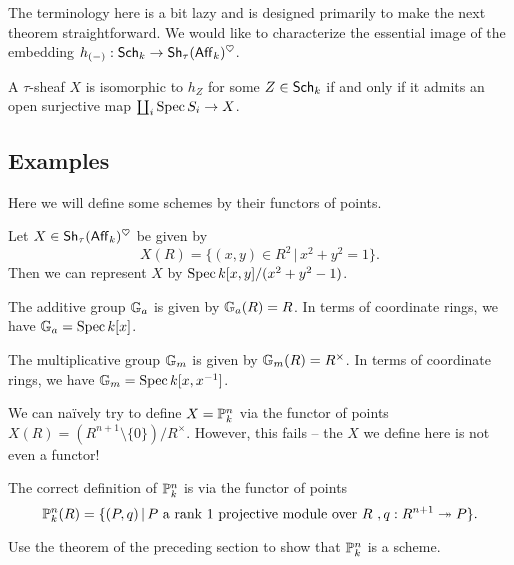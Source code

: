 \documentclass{amsart}
\begin{document}
The terminology here is a bit lazy and is designed primarily to make the next theorem straightforward.
We would like to characterize the essential image of the embedding $h_{(-)}: \mathsf{Sch}_k \to \mathsf{Sh}_\tau(\mathsf{Aff}_k)^\heartsuit$.

\begin{thm}
A $\tau$-sheaf $X$ is isomorphic to $h_Z$ for some $Z \in \mathsf{Sch}_k$ if and only if it admits an open surjective map $\coprod_i \operatorname{Spec} S_i \to X$.
\end{thm}

\subsection{Examples}

Here we will define some schemes by their functors of points.

\begin{ex}
	Let $X \in \mathsf{Sh}_\tau(\mathsf{Aff}_k)^\heartsuit$ be given by
	\[
		X(R) = \{ (x, y) \in R^2 \, | \, x^2 + y^2 = 1 \}.
	\]
	Then we can represent $X$ by $\operatorname{Spec} k[x, y] / (x^2 + y^2 - 1)$.
\end{ex}

\begin{ex}
	The additive group $\mathbb{G}_a$ is given by $\mathbb{G}_a(R) = R$.
	In terms of coordinate rings, we have $\mathbb{G}_a = \operatorname{Spec} k[x]$.
\end{ex}

\begin{ex}
	The multiplicative group $\mathbb{G}_m$ is given by $\mathbb{G}_m(R) = R^\times$.
	In terms of coordinate rings, we have $\mathbb{G}_m = \operatorname{Spec} k[x, x^{-1}]$.
\end{ex}

\begin{ex}
	We can na\"ively try to define $X = \mathbb{P}^n_k$ via the functor of points $X(R) = (R^{n+1} \setminus \{ 0 \}) / R^\times$.
	However, this fails -- the $X$ we define here is not even a functor!
\end{ex}

\begin{ex}
	The correct definition of $\mathbb{P}^n_k$ is via the functor of points
	\[
		\mathbb{P}^n_k(R) = \{ (P, q) \, | \, P \textrm{ a rank $1$ projective module over $R$ }, q: R^{n+1} \twoheadrightarrow P \}.
	\]
\end{ex}

\begin{exer}
	Use the theorem of the preceding section to show that $\mathbb{P}^n_k$ is a scheme.
\end{exer}
\end{document}
